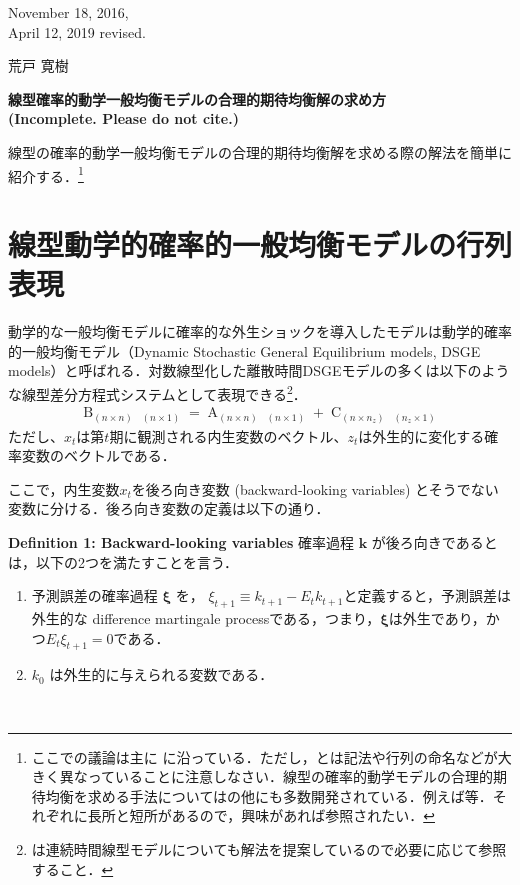\documentclass[a4j, dvipdfmx]{jarticle}
\begin{document}
\begin{flushright}
November 18, 2016,\\
April 12, 2019 revised.

荒戸 寛樹
\end{flushright}
\begin{center}
\Large{\textbf{
線型確率的動学一般均衡モデルの合理的期待均衡解の求め方 \\ (Incomplete. Please do not cite.)
}}
\end{center}
\vspace{10pt}
線型の確率的動学一般均衡モデルの合理的期待均衡解を求める際の解法を簡単に紹介する．\footnote{ここでの議論は主に\citet{klein2000} に沿っている．ただし，\citet{klein2000}とは記法や行列の命名などが大きく異なっていることに注意しなさい．線型の確率的動学モデルの合理的期待均衡を求める手法については\citet{klein2000}の他にも多数開発されている．例えば\citet{sims2002}等．それぞれに長所と短所があるので，興味があれば参照されたい．}
\section{線型動学的確率的一般均衡モデルの行列表現}
動学的な一般均衡モデルに確率的な外生ショックを導入したモデルは動学的確率的一般均衡モデル（Dynamic Stochastic General Equilibrium models, DSGE models）と呼ばれる．対数線型化した離散時間DSGEモデルの多くは以下のような線型差分方程式システムとして表現できる\footnote{\citet{sims2002}は連続時間線型モデルについても解法を提案しているので必要に応じて参照すること．}．
\begin{align}
\mathop{B}_{(n \times n)} \mathop{E_tx_{t+1}}_{(n \times 1)} = \mathop{A}_{(n\times n)} \mathop{x_t}_{(n\times 1)} + \mathop{C}_{(n \times n_z)} \mathop{z_t}_{(n_z \times 1)} \label{model}
\end{align}
ただし、$x_t$は第$t$期に観測される内生変数のベクトル、$z_t$は外生的に変化する確率変数のベクトルである．

ここで，内生変数$x_t$を後ろ向き変数 (backward-looking variables) とそうでない変数に分ける．後ろ向き変数の定義は以下の通り．\\

\begin{itembox}[l]{\bf{Definition 1: Backward-looking variables}}
確率過程 $\mathbf{k}$ が後ろ向きであるとは，以下の2つを満たすことを言う．
\begin{enumerate}
\item 予測誤差の確率過程 $\boldsymbol{\xi}$ を， $\xi_{t+1} \equiv k_{t+1} - E_tk_{t+1}$と定義すると，予測誤差は外生的な difference martingale processである，つまり，$\boldsymbol{\xi}$は外生であり，かつ$E_t\xi_{t+1} = 0$である．
\item $k_0$ は外生的に与えられる変数である．
\end{enumerate}
\end{itembox}\\
\end{document}
